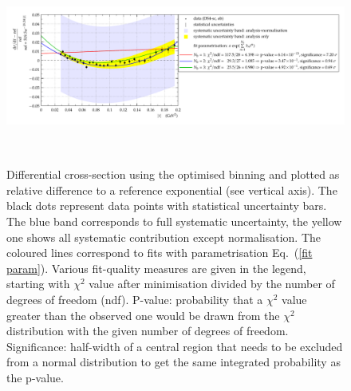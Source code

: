 \begin{figure}
\vskip-5mm
\begin{center}
\includegraphics[height=6.5cm]{fig/t_dist_rel_with_fits.pdf}
\vskip-6mm
\caption{%
Differential cross-section using the optimised binning and plotted as relative difference to a reference exponential (see vertical axis). The black dots represent data points with statistical uncertainty bars. The blue band corresponds to full systematic uncertainty, the yellow one shows all systematic contribution except normalisation. The coloured lines correspond to fits with parametrisation Eq.~(\ref{fit param}).
Various fit-quality measures are given in the legend, starting with $\chi^2$ value after minimisation divided by the number of degrees of freedom (ndf). P-value: probability that a $\chi^2$ value greater than the observed one would be drawn from the $\chi^2$ distribution with the given number of degrees of freedom. Significance: half-width of a central region that needs to be excluded from a normal distribution to get the same integrated probability as the p-value.
}
\label{fig:data rel ob}
\end{center}
\vskip-2mm
\end{figure}



